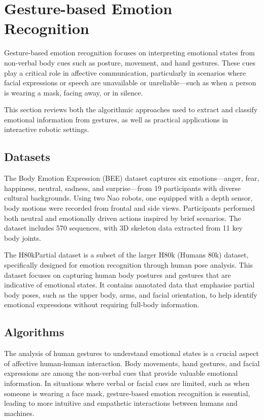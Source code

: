 \section{Gesture-based Emotion Recognition}
Gesture-based emotion recognition focuses on interpreting emotional states from non-verbal body cues such as posture, movement, and hand gestures. These cues play a critical role in affective communication, particularly in scenarios where facial expressions or speech are unavailable or unreliable—such as when a person is wearing a mask, facing away, or in silence.

This section reviews both the algorithmic approaches used to extract and classify emotional information from gestures, as well as practical applications in interactive robotic settings.

\subsection{Datasets}
The Body Emotion Expression (BEE) dataset \cite{Elfaramawy2017-ab} captures six emotions—anger, fear, happiness, neutral, sadness, and surprise—from 19 participants with diverse cultural backgrounds. Using two Nao robots, one equipped with a depth sensor, body motions were recorded from frontal and side views. Participants performed both neutral and emotionally driven actions inspired by brief scenarios. The dataset includes 570 sequences, with 3D skeleton data extracted from 11 key body joints.

The H80kPartial dataset \cite{8578328} is a subset of the larger H80k (Humans 80k) dataset, specifically designed for emotion recognition through human pose analysis. This dataset focuses on capturing human body postures and gestures that are indicative of emotional states. It contains annotated data that emphasise partial body poses, such as the upper body, arms, and facial orientation, to help identify emotional expressions without requiring full-body information.

\subsection{Algorithms}
The analysis of human gestures to understand emotional states is a crucial aspect of affective human-human interaction. Body movements, hand gestures, and facial expressions are among the non-verbal cues that provide valuable emotional information. In situations where verbal or facial cues are limited, such as when someone is wearing a face mask, gesture-based emotion recognition is essential, leading to more intuitive and empathetic interactions between humans and machines.

